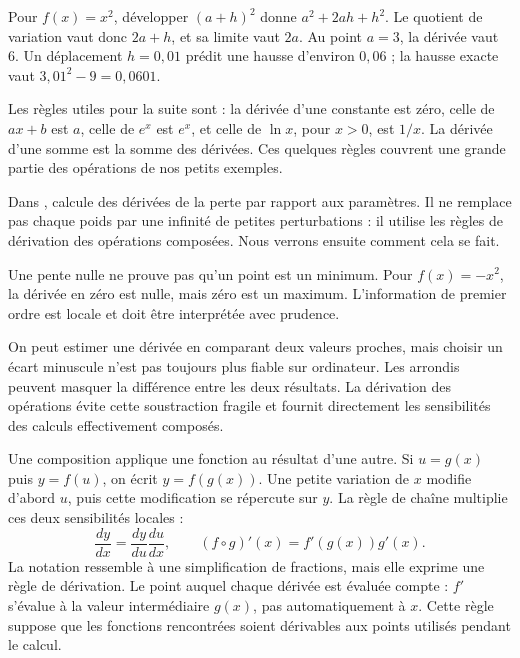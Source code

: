 Pour \(f(x)=x^2\), développer \((a+h)^2\) donne
\(a^2+2ah+h^2\). Le quotient de variation vaut donc
\(2a+h\), et sa limite vaut \(2a\). Au point \(a=3\),
la dérivée vaut 6. Un déplacement \(h=0{,}01\) prédit
une hausse d'environ \(0{,}06\) ; la hausse exacte vaut
\(3{,}01^2-9=0{,}0601\).

Les règles utiles pour la suite sont :
la dérivée d'une constante est zéro, celle de \(ax+b\)
est \(a\), celle de \(e^x\) est \(e^x\), et celle
de \(\ln x\), pour \(x>0\), est \(1/x\).
La dérivée d'une somme est la somme des dérivées.
Ces quelques règles couvrent une grande partie des opérations
de nos petits exemples.

Dans ,  calcule des
dérivées de la perte par rapport aux paramètres.
Il ne remplace pas chaque poids par une infinité de petites
perturbations : il utilise les règles de dérivation des opérations
composées. Nous verrons ensuite comment cela se fait.

Une pente nulle ne prouve pas qu'un point est un minimum.
Pour \(f(x)=-x^2\), la dérivée en zéro est nulle,
mais zéro est un maximum. L'information de premier ordre
est locale et doit être interprétée avec prudence.

On peut estimer une dérivée en comparant deux valeurs proches,
mais choisir un écart minuscule n'est pas toujours plus fiable
sur ordinateur. Les arrondis peuvent masquer la différence entre
les deux résultats. La dérivation des opérations évite cette
soustraction fragile et fournit directement les sensibilités
des calculs effectivement composés.



Une composition applique une fonction au résultat d'une autre.
Si \(u=g(x)\) puis \(y=f(u)\), on écrit
\(y=f(g(x))\). Une petite variation de \(x\) modifie
d'abord \(u\), puis cette modification se répercute sur \(y\).
La règle de chaîne multiplie ces deux sensibilités locales :
\[
 \frac{dy}{dx}=\frac{dy}{du}\frac{du}{dx},
 \qquad (f\circ g)'(x)=f'(g(x))g'(x).
\]
La notation ressemble à une simplification de fractions,
mais elle exprime une règle de dérivation. Le point auquel
chaque dérivée est évaluée compte : \(f'\) s'évalue à
la valeur intermédiaire \(g(x)\), pas automatiquement à \(x\).
Cette règle suppose que les fonctions rencontrées soient dérivables
aux points utilisés pendant le calcul.

